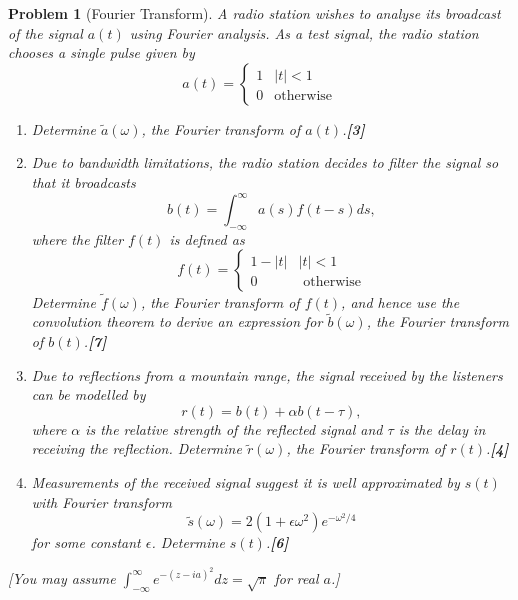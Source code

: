 \documentclass[a4paper]{article}
\theoremstyle{new}
\newtheorem{qns}{Problem}[section]
\begin{document}
\begin{qns}[Fourier Transform]
A radio station wishes to analyse its broadcast of the signal $a(t)$ using Fourier analysis. As a test signal, the radio station chooses a single pulse given by
$$a(t)=
\left\{
        \begin{array}{ll}
      1 & |t|<1 \\
      0 & \text{otherwise}
        \end{array}
    \right.$$
\begin{enumerate}[label=(\alph*)]
\item Determine $\tilde{a}(\omega)$, the Fourier transform of $a(t)$.\hfill \textbf{[3]}
\item Due to bandwidth limitations, the radio station decides to filter the signal so that it broadcasts
$$b(t)=\int_{-\infty}^\infty a(s)f(t-s)ds,$$
where the filter $f(t)$ is defined as
$$f(t)=
\left\{
        \begin{array}{ll}
      1-|t| & |t|<1 \\
      0 & \text{ otherwise}
        \end{array}
    \right.$$
Determine $\tilde{f}(\omega)$, the Fourier transform of $f(t)$, and hence use the convolution theorem to derive an expression for $\tilde{b}(\omega)$, the Fourier transform of $b(t)$.\hfill \textbf{[7]}
\item Due to reflections from a mountain range, the signal received by the listeners can be modelled by
$$r(t)=b(t)+\alpha b(t-\tau),$$
where $\alpha$ is the relative strength of the reflected signal and $\tau$ is the delay in receiving the reflection. Determine $\tilde{r}(\omega)$, the Fourier transform of $r(t)$.\hfill \textbf{[4]}
\item Measurements of the received signal suggest it is well approximated by $s(t)$ with Fourier transform
$$\tilde{s}(\omega)=2(1+\epsilon\omega^2)e^{-\omega^2/4}$$
for some constant $\epsilon$. Determine $s(t)$.\hfill \textbf{[6]}
\end{enumerate}
[You may assume $\int_{-\infty}^\infty e^{-(z-ia)^2}dz=\sqrt{\pi}$ for real $a$.]
\end{qns}
\end{document}

